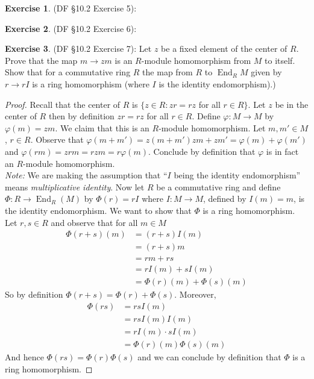 \documentclass[8pt]{amsart}
\theoremstyle{plain}%
\theoremstyle{definition}
\newtheorem{exercise}{Exercise}[section]
\theoremstyle{remark}
\numberwithin{equation}{section}
\begin{document}
\begin{exercise}
(DF \S 10.2 Exercise 5):
\end{exercise}

\begin{exercise}
(DF \S 10.2 Exercise 6):
\end{exercise}

\begin{exercise}
(DF \S 10.2 Exercise 7): Let $z$ be a fixed element of the center of $R$. Prove that the map $m \to zm$ is an $R$-module homomorphism from $M$ to itself. Show that for a commutative ring $R$ the map from $R$ to $\operatorname{End}_R{M}$ given by $r \to rI$ is a ring homomorphism (where $I$ is the identity endomorphism).)
	\begin{proof}
		Recall that the center of $R$ is $\{z \in R : zr = rz$ for all $r \in R\}$. Let $z$ be in the center of $R$ then by definition $zr = rz$ for all $r \in R$. Define $\varphi : M \to M$ by $\varphi(m) = zm$. We claim that this is an $R$-module homomorphism. Let $m, m' \in M$, $r \in R$. Observe that $\varphi(m + m') = z(m + m') zm + zm' = \varphi(m) + \varphi(m')$ and $\varphi(rm) = zrm = rzm = r\varphi(m)$. Conclude by definition that $\varphi$ is in fact an $R$-module homomorphism.\\

		\textit{Note:} We are making the assumption that ``$I$ being the identity endomorphism'' means \textit{multiplicative identity}. Now let $R$ be a commutative ring and define $\Phi : R \to \operatorname{End}_R(M)$ by $\Phi(r) = rI$ where $I : M \to M$, defined by $I(m) = m$, is the identity endomorphism. We want to show that $\Phi$ is a ring homomorphism. Let $r, s \in R$ and observe that for all $m \in M$
		\begin{align*}
			\Phi(r + s)(m) &= (r + s)I(m)\\
			&= (r + s)m\\
			&= rm + rs\\
			&= rI(m) + sI(m)\\
			&= \Phi(r)(m) + \Phi(s)(m)
		\end{align*}
		So by definition $\Phi(r + s) = \Phi(r) + \Phi(s)$. Moreover,
		\begin{align*}
			\Phi(rs) &= rsI(m)\\
			&= rsI(m)I(m)\\
			&= rI(m) \cdot sI(m)\\
			&= \Phi(r)(m) \Phi(s)(m)
		\end{align*}
		And hence $\Phi(rs) = \Phi(r)\Phi(s)$ and we can conclude by definition that $\Phi$ is a ring homomorphism.
	\end{proof}
\end{exercise}
\end{document}
